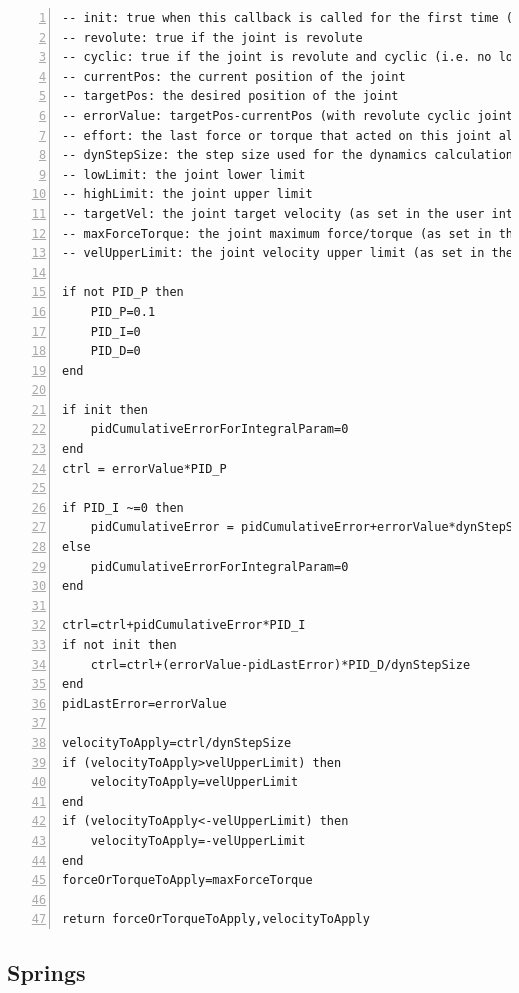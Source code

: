 \begin{lstlisting}[language={[5.0]Lua}, numbers = left, tabsize = 4, frame=leftline, keywordstyle=\color{blue}, float, caption=Control code of the servo, captionpos = b ]
-- init: true when this callback is called for the first time (if the joint is dynamically reset during the simulation, this might be true more often)
-- revolute: true if the joint is revolute
-- cyclic: true if the joint is revolute and cyclic (i.e. no lower/upper limits)
-- currentPos: the current position of the joint
-- targetPos: the desired position of the joint
-- errorValue: targetPos-currentPos (with revolute cyclic joints we take the shortest cyclic distance)
-- effort: the last force or torque that acted on this joint along/around its axis. With Bullet, torques from joint limits are not taken into account
-- dynStepSize: the step size used for the dynamics calculations (by default 5ms)
-- lowLimit: the joint lower limit
-- highLimit: the joint upper limit
-- targetVel: the joint target velocity (as set in the user interface)
-- maxForceTorque: the joint maximum force/torque (as set in the user interface)
-- velUpperLimit: the joint velocity upper limit (as set in the user interface)

if not PID_P then
    PID_P=0.1
    PID_I=0
    PID_D=0
end

if init then
    pidCumulativeErrorForIntegralParam=0
end
ctrl = errorValue*PID_P

if PID_I ~=0 then
    pidCumulativeError = pidCumulativeError+errorValue*dynStepSize
else
    pidCumulativeErrorForIntegralParam=0
end

ctrl=ctrl+pidCumulativeError*PID_I
if not init then
    ctrl=ctrl+(errorValue-pidLastError)*PID_D/dynStepSize
end
pidLastError=errorValue

velocityToApply=ctrl/dynStepSize
if (velocityToApply>velUpperLimit) then
    velocityToApply=velUpperLimit
end
if (velocityToApply<-velUpperLimit) then
    velocityToApply=-velUpperLimit
end
forceOrTorqueToApply=maxForceTorque

return forceOrTorqueToApply,velocityToApply
\end{lstlisting}

\subsection{Springs}

